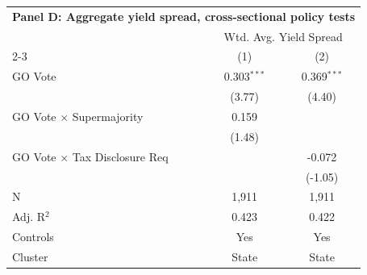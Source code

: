 \begingroup
\centering
\begin{tabular*}{\textwidth}{@{\extracolsep{\fill}}lcc}
\multicolumn{3}{l}{\textbf{Panel D: Aggregate yield spread, cross-sectional policy tests}}\\

\addlinespace
   \toprule
    & \multicolumn{2}{c}{Wtd. Avg. Yield Spread}\\
   \cmidrule(lr){2-3}
                                        & (1)           & (2)\\  
   \midrule 
   GO Vote                              & 0.303$^{***}$ & 0.369$^{***}$\\   
                                        & (3.77)       & (4.40)\\   
   GO Vote $\times$ Supermajority       & 0.159         &   \\   
                                        & (1.48)       &   \\   
   GO Vote $\times$ Tax Disclosure Req  &               & -0.072\\   
                                        &               & (-1.05)\\   
   \hline
   N                         & 1,911         & 1,911\\  
   Adj. R$^2$                       & 0.423         & 0.422\\  
   Controls                   & Yes            & Yes\\
   Cluster              & State & State\\  
   \bottomrule
\end{tabular*}
\par\endgroup
